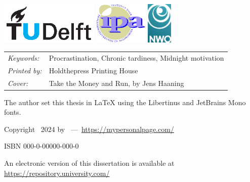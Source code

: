 \begin{titlepage}
\medskip
\vfill
\begin{center}
  \includegraphics[trim={0.2cm 0.8cm 0.3cm 0.3cm},clip,height=2.0cm]{0000-title/TUDelft_logo_cmyk}
  \hspace{2em}
  \includegraphics[height=2.0cm]{0000-title/ipa}
  \hspace{2em}
  \includegraphics[height=2.0cm]{0000-title/NWO logo - full colour - CMYK}
\end{center}
\vfill

\noindent
\begin{tabular}{@{}p{}@{}p{}}
  \textit{Keywords:} & Procrastination, Chronic tardiness, Midnight motivation \\[\medskipamount]
  \textit{Printed by:} & Holdthepress Printing House \\[\medskipamount]
  \textit{Cover:} & Take the Money and Run, by Jens Haaning \\[\medskipamount]
\end{tabular}

\medskip
\medskip

\noindent The author set this thesis in \LaTeX\xspace using the Libertinus and JetBrains Mono fonts.

\vspace{\bigskipamount}

\noindent Copyright \textcopyright\ 2024 by \makeatletter{\@firstname\ \@lastname}\makeatother\ ---\ \url{https://mypersonalpage.com/}

\medskip

\noindent ISBN 000-0-00000-000-0

\medskip
\noindent An electronic version of this dissertation is available at \\
\url{https://repository.university.com/}

\end{titlepage}